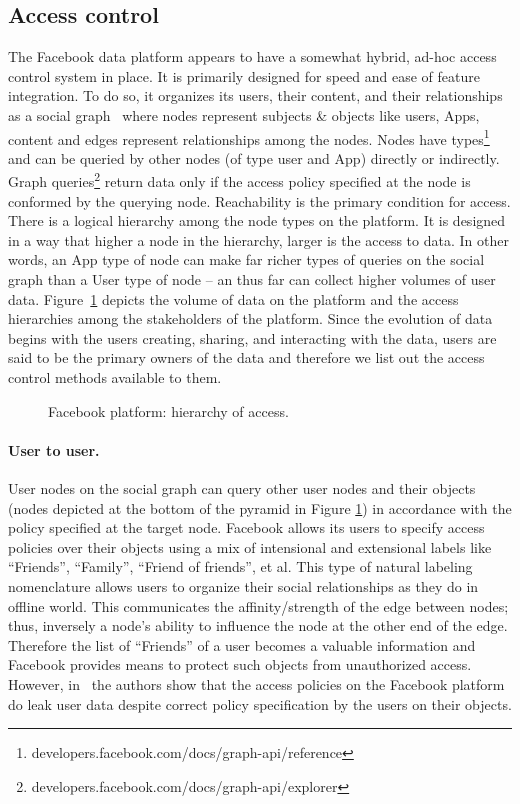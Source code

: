 \documentclass[runningheads]{llncs}
\begin{document}
\subsection{Access control}
The Facebook data platform appears to have a somewhat hybrid, ad-hoc
access control system in place. It is primarily designed for speed and
ease of feature integration. To do so, it organizes its users, their
content, and their relationships as a social graph~\cite{fb-tao} where
nodes represent subjects \& objects like users, Apps, content and
edges represent relationships among the nodes. Nodes have
types\footnote{developers.facebook.com/docs/graph-api/reference} and
can be queried by other nodes (of type user and App) directly or
indirectly. Graph
queries\footnote{developers.facebook.com/docs/graph-api/explorer}
return data only if the access policy specified at the node is
conformed by the querying node. Reachability is the primary condition
for access. There is a logical hierarchy among the node types on the
platform. It is designed in a way that higher a node in the hierarchy,
larger is the access to data. In other words, an App type of node can
make far richer types of queries on the social graph than a User type
of node -- an thus far can collect higher volumes of user
data. Figure~\ref{fig:access-hierarchy} depicts the volume of data on
the platform and the access hierarchies among the stakeholders of the
platform. Since the evolution of data begins with the users creating,
sharing, and interacting with the data, users are said to be the
primary owners of the data and therefore we list out the access
control methods available to them.
\begin{figure}[!tp]
  \centering
  {}
  \caption{Facebook platform: hierarchy of access.}
  \label{fig:access-hierarchy}
\end{figure}
\paragraph{User to user.} User nodes on the social graph can query
other user nodes and their objects (nodes depicted at the bottom of
the pyramid in Figure \ref{fig:access-hierarchy}) in accordance with
the policy specified at the target node. Facebook allows its users to
specify access policies over their objects using a mix of intensional
and extensional labels like ``Friends'', ``Family'', ``Friend of
friends'', et al. This type of natural labeling nomenclature allows
users to organize their social relationships as they do in offline
world. This communicates the affinity/strength of the edge between
nodes; thus, inversely a node's ability to influence the node at the
other end of the edge. Therefore the list of ``Friends'' of a user
becomes a valuable information and Facebook provides means to protect
such objects from unauthorized access. However, in~\cite{vtp-rks-fb1}
the authors show that the access policies on the Facebook platform do
leak user data despite correct policy specification by the users on
their objects.
\end{document}
